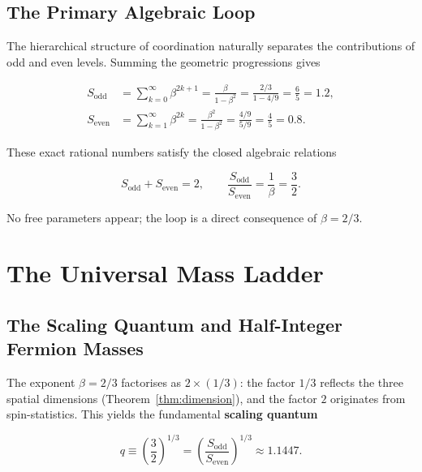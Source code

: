 \documentclass[12pt,a4paper]{article}
\theoremstyle{remark}
\begin{document}
	\subsection{The Primary Algebraic Loop}
	\label{sec:algebraic-loop}
	
	The hierarchical structure of coordination naturally separates the contributions
	of odd and even levels.  Summing the geometric progressions gives
	
	\begin{align}
		S_{\mathrm{odd}} &= \sum_{k=0}^{\infty} \beta^{2k+1} = \frac{\beta}{1-\beta^{2}}
		= \frac{2/3}{1 - 4/9} = \frac{6}{5} = 1.2, \label{eq:sodd}\\
		S_{\mathrm{even}} &= \sum_{k=1}^{\infty} \beta^{2k} = \frac{\beta^{2}}{1-\beta^{2}}
		= \frac{4/9}{5/9} = \frac{4}{5} = 0.8. \label{eq:seven}
	\end{align}
	
	These exact rational numbers satisfy the closed algebraic relations
	
	\begin{equation}
		\boxed{S_{\mathrm{odd}} + S_{\mathrm{even}} = 2, \qquad
			\frac{S_{\mathrm{odd}}}{S_{\mathrm{even}}} = \frac{1}{\beta} = \frac{3}{2}}.
		\label{eq:algebraic-loop}
	\end{equation}
	
	No free parameters appear; the loop is a direct consequence of \(\beta = 2/3\).
	
	\section{The Universal Mass Ladder}
	\label{sec:mass-ladder}
	
	\subsection{The Scaling Quantum and Half-Integer Fermion Masses}
	
	The exponent \(\beta = 2/3\) factorises as \(2 \times (1/3)\): the factor \(1/3\)
	reflects the three spatial dimensions (Theorem~\ref{thm:dimension}), and the
	factor \(2\) originates from spin-statistics.  This yields the fundamental
	\textbf{scaling quantum}
	
	\begin{equation}
		q \equiv \left(\frac{3}{2}\right)^{1/3}
		= \left(\frac{S_{\mathrm{odd}}}{S_{\mathrm{even}}}\right)^{1/3} \approx 1.1447.
	\end{equation}
	
\end{document}

